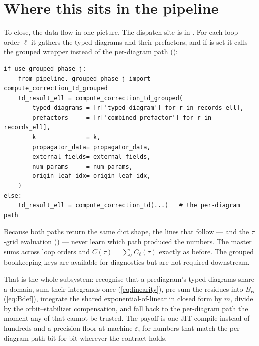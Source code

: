 \section{Where this sits in the pipeline}

To close, the data flow in one picture. The dispatch site is
 in . For each loop order
$\ell$ it gathers the typed diagrams and their prefactors, and if
 is set it calls the grouped wrapper instead of the
per-diagram path ():
\begin{lstlisting}
if use_grouped_phase_j:
    from pipeline._grouped_phase_j import compute_correction_td_grouped
    td_result_ell = compute_correction_td_grouped(
        typed_diagrams = [r['typed_diagram'] for r in records_ell],
        prefactors     = [r['combined_prefactor'] for r in records_ell],
        k              = k,
        propagator_data= propagator_data,
        external_fields= external_fields,
        num_params     = num_params,
        origin_leaf_idx= origin_leaf_idx,
    )
else:
    td_result_ell = compute_correction_td(...)   # the per-diagram path
\end{lstlisting}
Because both paths return the same dict shape, the lines that follow ---
 and the $\tau$-grid
evaluation 
() --- never learn which path produced the
numbers. The master  sums across loop orders and $C(\tau) =
\sum_\ell C_\ell(\tau)$ exactly as before. The grouped bookkeeping keys are
available for diagnostics but are not required downstream.

That is the whole subsystem: recognise that a prediagram's typed diagrams share a
domain, sum their integrands once (\eqref{eq:linearity}), pre-sum the residues
into $B_{\bm\alpha}$ (\eqref{eq:Bdef}), integrate the shared exponential-of-linear
in closed form by $m$, divide by the orbit--stabilizer compensation, and fall back
to the per-diagram path the moment any of that cannot be trusted. The payoff is
one JIT compile instead of hundreds and a precision floor at machine $\varepsilon$,
for numbers that match the per-diagram path bit-for-bit wherever the contract
holds.
